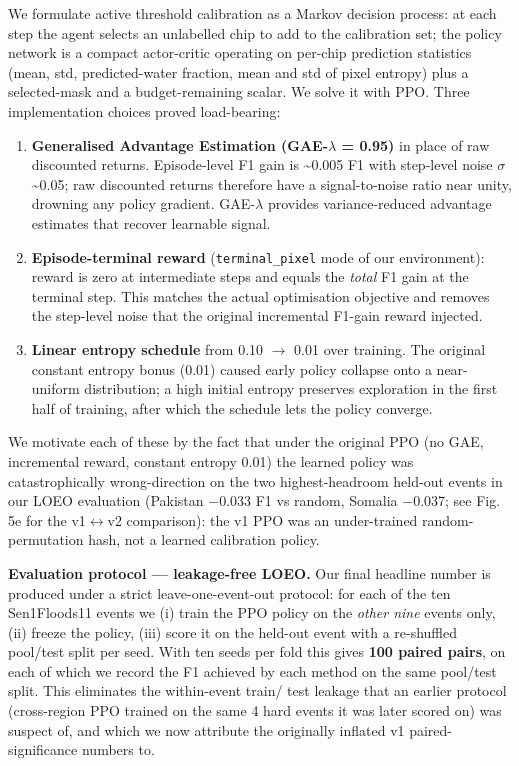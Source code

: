 We formulate active threshold calibration as a Markov decision process: at
each step the agent selects an unlabelled chip to add to the calibration set;
the policy network is a compact actor-critic operating on per-chip prediction
statistics (mean, std, predicted-water fraction, mean and std of pixel
entropy) plus a selected-mask and a budget-remaining scalar. We solve it
with PPO. Three implementation choices proved load-bearing:

\begin{enumerate}
\def\labelenumi{\arabic{enumi}.}
\tightlist
\item
  \textbf{Generalised Advantage Estimation (GAE-$\lambda$ = 0.95)} in place of raw
  discounted returns. Episode-level F1 gain is \textasciitilde0.005 F1 with step-level
  noise $\sigma$ \textasciitilde0.05; raw discounted returns therefore have a signal-to-noise
  ratio near unity, drowning any policy gradient. GAE-$\lambda$ provides
  variance-reduced advantage estimates that recover learnable signal.
\item
  \textbf{Episode-terminal reward} (\texttt{terminal\_pixel} mode of our environment):
  reward is zero at intermediate steps and equals the \emph{total} F1 gain at
  the terminal step. This matches the actual optimisation objective and
  removes the step-level noise that the original incremental F1-gain
  reward injected.
\item
  \textbf{Linear entropy schedule} from 0.10 $\rightarrow$ 0.01 over training. The original
  constant entropy bonus (0.01) caused early policy collapse onto a
  near-uniform distribution; a high initial entropy preserves exploration
  in the first half of training, after which the schedule lets the policy
  converge.
\end{enumerate}

We motivate each of these by the fact that under the original PPO (no GAE,
incremental reward, constant entropy 0.01) the learned policy was
catastrophically wrong-direction on the two highest-headroom held-out events
in our LOEO evaluation (Pakistan $-$0.033 F1 vs random, Somalia $-$0.037; see
Fig. 5e for the v1$\leftrightarrow$v2 comparison): the v1 PPO was an
under-trained random-permutation hash, not a learned calibration policy.

\textbf{Evaluation protocol --- leakage-free LOEO.} Our final headline number is
produced under a strict leave-one-event-out protocol: for each of the ten
Sen1Floods11 events we (i) train the PPO policy on the \emph{other nine} events
only, (ii) freeze the policy, (iii) score it on the held-out event with a
re-shuffled pool/test split per seed. With ten seeds per fold this gives
\textbf{100 paired pairs}, on each of which we record the F1 achieved by each
method on the same pool/test split. This eliminates the within-event train/
test leakage that an earlier protocol (cross-region PPO trained on the same
4 hard events it was later scored on) was suspect of, and which we now
attribute the originally inflated v1 paired-significance numbers to.

